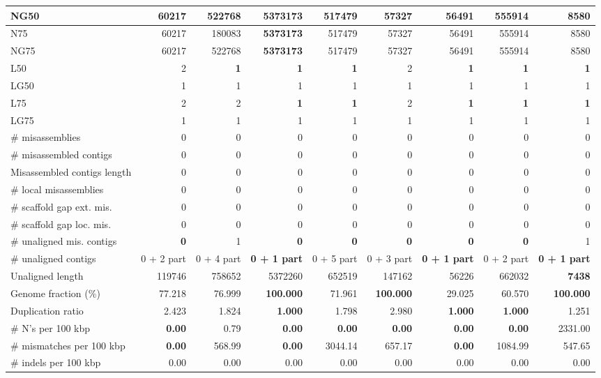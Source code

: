 \documentclass[12pt,a4paper]{article}
\begin{document}
\begin{table}[ht]
\begin{center}
\begin{tabular}{|l*{8}{|r}|}
NG50 & 60217 & 522768 & {\bf 5373173} & 517479 & 57327 & 56491 & 555914 & 8580 \\ \hline
N75 & 60217 & 180083 & {\bf 5373173} & 517479 & 57327 & 56491 & 555914 & 8580 \\ \hline
NG75 & 60217 & 522768 & {\bf 5373173} & 517479 & 57327 & 56491 & 555914 & 8580 \\ \hline
L50 & 2 & {\bf 1} & {\bf 1} & {\bf 1} & 2 & {\bf 1} & {\bf 1} & {\bf 1} \\ \hline
LG50 & 1 & 1 & 1 & 1 & 1 & 1 & 1 & 1 \\ \hline
L75 & 2 & 2 & {\bf 1} & {\bf 1} & 2 & {\bf 1} & {\bf 1} & {\bf 1} \\ \hline
LG75 & 1 & 1 & 1 & 1 & 1 & 1 & 1 & 1 \\ \hline
\# misassemblies & 0 & 0 & 0 & 0 & 0 & 0 & 0 & 0 \\ \hline
\# misassembled contigs & 0 & 0 & 0 & 0 & 0 & 0 & 0 & 0 \\ \hline
Misassembled contigs length & 0 & 0 & 0 & 0 & 0 & 0 & 0 & 0 \\ \hline
\# local misassemblies & 0 & 0 & 0 & 0 & 0 & 0 & 0 & 0 \\ \hline
\# scaffold gap ext. mis. & 0 & 0 & 0 & 0 & 0 & 0 & 0 & 0 \\ \hline
\# scaffold gap loc. mis. & 0 & 0 & 0 & 0 & 0 & 0 & 0 & 0 \\ \hline
\# unaligned mis. contigs & {\bf 0} & 1 & {\bf 0} & {\bf 0} & {\bf 0} & {\bf 0} & {\bf 0} & 1 \\ \hline
\# unaligned contigs & 0 + 2 part & 0 + 4 part & {\bf 0 + 1 part} & 0 + 5 part & 0 + 3 part & {\bf 0 + 1 part} & 0 + 2 part & {\bf 0 + 1 part} \\ \hline
Unaligned length & 119746 & 758652 & 5372260 & 652519 & 147162 & 56226 & 662032 & {\bf 7438} \\ \hline
Genome fraction (\%) & 77.218 & 76.999 & {\bf 100.000} & 71.961 & {\bf 100.000} & 29.025 & 60.570 & {\bf 100.000} \\ \hline
Duplication ratio & 2.423 & 1.824 & {\bf 1.000} & 1.798 & 2.980 & {\bf 1.000} & {\bf 1.000} & 1.251 \\ \hline
\# N's per 100 kbp & {\bf 0.00} & 0.79 & {\bf 0.00} & {\bf 0.00} & {\bf 0.00} & {\bf 0.00} & {\bf 0.00} & 2331.00 \\ \hline
\# mismatches per 100 kbp & {\bf 0.00} & 568.99 & {\bf 0.00} & 3044.14 & 657.17 & {\bf 0.00} & 1084.99 & 547.65 \\ \hline
\# indels per 100 kbp & 0.00 & 0.00 & 0.00 & 0.00 & 0.00 & 0.00 & 0.00 & 0.00 \\ \hline

\end{tabular}
\end{center}
\end{table}
\end{document}
